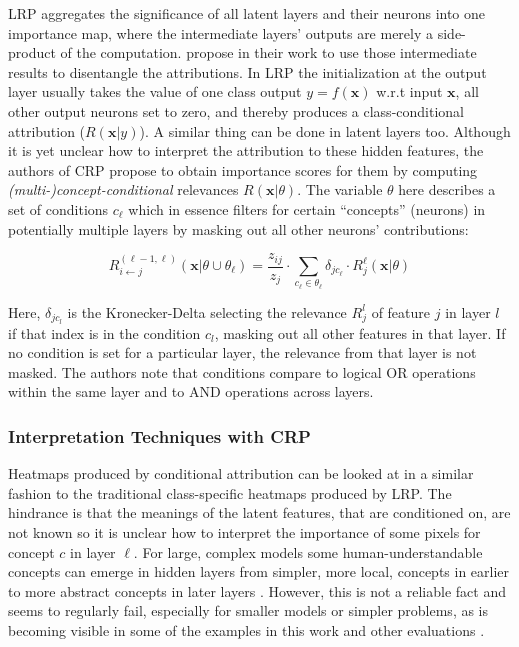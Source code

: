 LRP aggregates the significance of all latent layers and their neurons into one importance map, where the intermediate layers' outputs are merely a side-product of the computation.
\cite{Achtibat2022} propose in their work to use those intermediate results to disentangle the attributions. In LRP the initialization at the output layer usually takes the value of one class output $y= f(\mathbf{x})$ w.r.t input $\mathbf{x}$, all other output neurons set to zero, and thereby produces a class-conditional attribution ($R(\mathbf{x}|y)$). A similar thing can be done in latent layers too. Although it is yet unclear how to interpret the attribution to these hidden features, the authors of CRP propose to obtain importance scores for them by computing \textit{(multi-)concept-conditional} relevances $R(\mathbf{x}|\theta)$. The variable $\theta$ here describes a set of conditions $c_{\ell}$ which in essence filters for certain ``concepts'' (neurons) in potentially multiple layers by masking out all other neurons' contributions:

\begin{equation}\displaystyle
    R^{(\ell-1, \ell)}_{i \leftarrow j} (\mathbf{x} | \theta \cup \theta_{\ell}) = \frac{z_{ij}}{z_j} \cdot \sum_{c_{\ell} \in \theta_{\ell}} \delta_{jc_{\ell}} \cdot R^{\ell}_j (\mathbf{x} | \theta )
\end{equation}

Here, $\delta_{jc_l}$ is the Kronecker-Delta selecting the relevance $R^l_j$ of feature $j$ in layer $l$ if that index is in the condition $c_l$, masking out all other features in that layer. If no condition is set for a particular layer, the relevance from that layer is not masked. The authors note that conditions compare to logical OR operations within the same layer and to AND operations across layers. 

\subsubsection{Interpretation Techniques with CRP}
Heatmaps produced by conditional attribution can be looked at in a similar fashion to the traditional class-specific heatmaps produced by LRP. The hindrance is that the meanings of the latent features, that are conditioned on, are not known so it is unclear how to interpret the importance of some pixels for concept $c$ in layer $\ell$. For large, complex models some human-understandable concepts can emerge in hidden layers from simpler, more local, concepts in earlier to more abstract concepts in later layers \citep{Bau2017, Hohman2020, Olah2017, Bau2020}. However, this is not a reliable fact and seems to regularly fail, especially for smaller models or simpler problems, as is becoming visible in some of the examples in this work and other evaluations \citep{Kim2018,Singla2022, Sixt2022a}.


